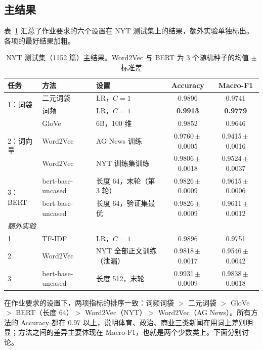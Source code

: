 \documentclass[lang=cn,a4paper]{elegantpaper}
\newcommand{\pmstd}[2]{#1\,$\pm$\,#2}
\begin{document}
\subsection{主结果}

表~\ref{tab:main} 汇总了作业要求的六个设置在 NYT 测试集上的结果，额外实验单独标出。各项的最好结果加粗。

\begin{table}[htbp]
  \centering
  \caption{NYT 测试集（1152 篇）主结果。Word2Vec 与 BERT 为 3 个随机种子的均值 $\pm$ 标准差}
  \label{tab:main}
  \begin{tabular}{lllcc}
    \toprule
    任务 & 方法 & 设置 & Accuracy & Macro-F1 \\
    \midrule
    \multirow{2}{*}{1：词袋} & 二元词袋 & LR，$C=1$ & 0.9896 & 0.9741 \\
     & 词频 & LR，$C=1$ & \textbf{0.9913} & \textbf{0.9779} \\
    \midrule
    \multirow{3}{*}{2：词向量} & GloVe & 6B，100 维 & 0.9852 & 0.9646 \\
     & Word2Vec & AG News 训练 & \pmstd{0.9760}{0.0005} & \pmstd{0.9415}{0.0016} \\
     & Word2Vec & NYT 训练集训练 & \pmstd{0.9806}{0.0018} & \pmstd{0.9524}{0.0037} \\
    \midrule
    \multirow{2}{*}{3：BERT} & bert-base-uncased & 长度 64，末轮（第 3 轮） & \pmstd{0.9826}{0.0009} & \pmstd{0.9615}{0.0006} \\
     & bert-base-uncased & 长度 64，验证集最优 & \pmstd{0.9826}{0.0009} & \pmstd{0.9611}{0.0012} \\
    \midrule
    \multicolumn{5}{l}{\textit{额外实验}} \\
    \midrule
    1 & TF-IDF & LR，$C=1$ & 0.9896 & 0.9751 \\
    2 & Word2Vec & NYT 全部正文训练（泄漏） & \pmstd{0.9818}{0.0017} & \pmstd{0.9546}{0.0042} \\
    3 & bert-base-uncased & 长度 512，末轮 & \pmstd{0.9931}{0.0009} & \pmstd{0.9838}{0.0018} \\
    \bottomrule
  \end{tabular}
\end{table}

在作业要求的设置下，两项指标的排序一致：词频词袋 $>$ 二元词袋 $>$ GloVe $>$ BERT（长度 64）$>$ Word2Vec（NYT）$>$ Word2Vec（AG News）。所有方法的 Accuracy 都在 0.97 以上，说明体育、政治、商业三类新闻在用词上差别明显；方法之间的差异主要体现在 Macro-F1，也就是两个少数类上。下面分别讨论。
\end{document}
